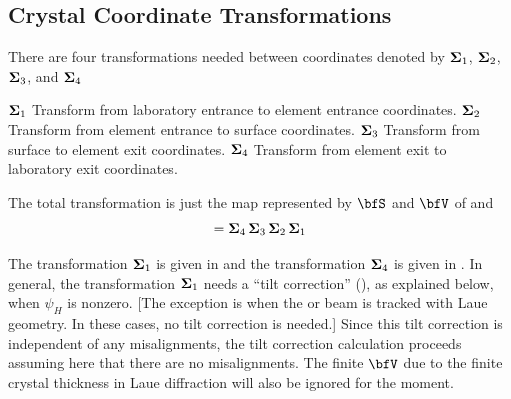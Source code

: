 \subsection{Crystal Coordinate Transformations}
\label{s:crystal.trans}

There are four transformations needed between coordinates
denoted by ${\bf \Sigma}_1$, ${\bf \Sigma}_2$, ${\bf \Sigma}_3$, and ${\bf \Sigma}_4$
\begin{example}
  \({\bf \Sigma}_1\)  Transform from laboratory entrance to element entrance coordinates.  
  \({\bf \Sigma}_2\)  Transform from element entrance to surface coordinates.  
  \({\bf \Sigma}_3\)  Transform from surface to element exit coordinates.  
  \({\bf \Sigma}_4\)  Transform from element exit to laboratory exit coordinates.  
\end{example}
The total transformation is just the map represented by $\bfS$ and
$\bfV$ of  and 
\begin{equation}
  [\bfS, \bfV] = \Bf\Sigma_4 \, \Bf\Sigma_3 \, \Bf\Sigma_2 \, \Bf\Sigma_1
\end{equation}

The transformation ${\bf \Sigma}_1$ is given in
 and the transformation ${\bf \Sigma}_4$ is
given in . In general, the transformation
${\bf \Sigma}_1$ needs a ``tilt correction'' (), as explained
below, when $\psi_H$ is nonzero.  [The exception is when the
 or  beam is tracked with Laue
geometry. In these cases, no tilt correction is needed.] Since this
tilt correction is independent of any misalignments, the tilt
correction calculation proceeds assuming here that there are no
misalignments. The finite $\bfV$ due to the finite crystal thickness
in Laue diffraction will also be ignored for the moment.

